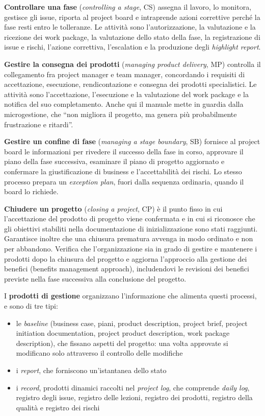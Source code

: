 \textbf{Controllare una fase} (\emph{controlling a stage}, CS) assegna il
lavoro, lo monitora, gestisce gli issue, riporta al project board e intraprende
azioni correttive perch\'e la fase resti entro le tolleranze. Le attivit\`a sono
l'autorizzazione, la valutazione e la ricezione dei work package, la valutazione
dello stato della fase, la registrazione di issue e rischi, l'azione correttiva,
l'escalation e la produzione degli \emph{highlight report}.

\textbf{Gestire la consegna dei prodotti} (\emph{managing product delivery}, MP)
controlla il collegamento fra project manager e team manager, concordando i
requisiti di accettazione, esecuzione, rendicontazione e consegna dei prodotti
specialistici. Le attivit\`a sono l'accettazione, l'esecuzione e la valutazione
del work package e la notifica del suo completamento. Anche qui il manuale mette
in guardia dalla microgestione, che ``non migliora il progetto, ma genera pi\`u
probabilmente frustrazione e ritardi''.

\textbf{Gestire un confine di fase} (\emph{managing a stage boundary}, SB)
fornisce al project board le informazioni per rivedere il successo della fase in
corso, approvare il piano della fase successiva, esaminare il piano di progetto
aggiornato e confermare la giustificazione di business e l'accettabilit\`a dei
rischi. Lo stesso processo prepara un \emph{exception plan}, fuori dalla
sequenza ordinaria, quando il board lo richiede.

\textbf{Chiudere un progetto} (\emph{closing a project}, CP) \`e il punto fisso
in cui l'accettazione del prodotto di progetto viene confermata e in cui si
riconosce che gli obiettivi stabiliti nella documentazione di inizializzazione
sono stati raggiunti. Garantisce inoltre che una chiusura prematura avvenga in
modo ordinato e non per abbandono. Verifica che l'organizzazione sia in grado di
gestire e mantenere i prodotti dopo la chiusura del progetto e aggiorna l'approccio
alla gestione dei benefici (benefits management approach), includendovi le revisioni
dei benefici previste nella fase successiva alla conclusione del progetto.

I \textbf{prodotti di gestione} organizzano l'informazione che alimenta questi
processi, e sono di tre tipi:
\begin {itemize}
\item le \emph{baseline} (business case, piani, product description, project
brief, project initiation documentation, project product description, work
package description), che fissano aspetti del progetto: una volta approvate si
modificano solo attraverso il controllo delle modifiche
\item i \emph{report}, che forniscono un'istantanea dello stato
\item i \emph{record}, prodotti dinamici raccolti nel \emph{project log}, che
comprende \emph{daily log}, registro degli issue, registro delle lezioni,
registro dei prodotti, registro della qualit\`a e registro dei rischi
\end {itemize}


